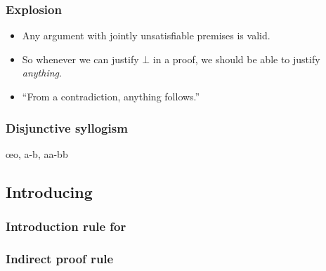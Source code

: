 \begin{frame}
  \frametitle{Explosion}

  \begin{itemize}[<+->]
  \item Any argument with jointly unsatisfiable premises is valid.
  \item So whenever we can justify $\bot$ in a proof, we should be able to
  justify \emph{anything}.
  \item ``From a contradiction, anything follows.''

  \begin{fitchproof}
     
  \end{fitchproof}
  \end{itemize}
\end{frame}

\begin{frame}
  \frametitle{Disjunctive syllogism}
  \begin{fitchproof}
    \open
     
    \close
    \open
    \close
     \oe{o, a-b, aa-bb}
  \end{fitchproof}
\end{frame}

\subsection{Introducing \enot}



\begin{frame}
  \frametitle{Introduction rule for \enot}
  \begin{fitchproof}
    \open
    \ellipsesline
    \close
     
  \end{fitchproof}
\end{frame}



\begin{frame}
  \frametitle{Indirect proof rule}
  \begin{fitchproof}
    \open
    \ellipsesline
    \close
     
  \end{fitchproof}
\end{frame}

